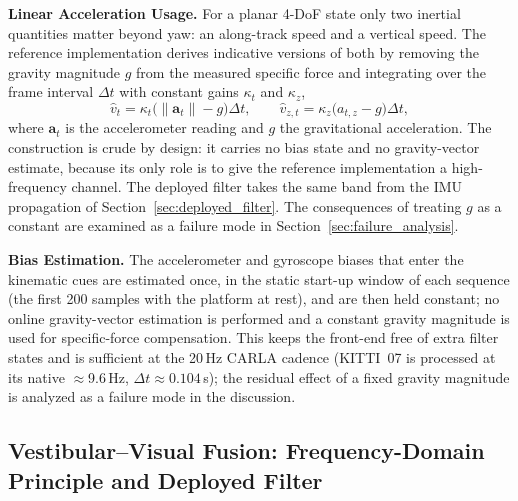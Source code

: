 \textbf{Linear Acceleration Usage.} For a planar 4-DoF state only two inertial quantities matter beyond yaw: an along-track speed and a vertical speed. The reference implementation derives indicative versions of both by removing the gravity magnitude $g$ from the measured specific force and integrating over the frame interval $\Delta t$ with constant gains $\kappa_t$ and $\kappa_z$,
\begin{equation}
    \hat v_{t} = \kappa_t\big(\lVert\mathbf{a}_t\rVert - g\big)\Delta t,
    \qquad
    \hat v_{z,t} = \kappa_z\big(a_{t,z} - g\big)\Delta t,
\end{equation}
where $\mathbf{a}_t$ is the accelerometer reading and $g$ the gravitational acceleration. The construction is crude by design: it carries no bias state and no gravity-vector estimate, because its only role is to give the reference implementation a high-frequency channel. The deployed filter takes the same band from the IMU propagation of Section~\ref{sec:deployed_filter}. The consequences of treating $g$ as a constant are examined as a failure mode in Section~\ref{sec:failure_analysis}.

\textbf{Bias Estimation.} The accelerometer and gyroscope biases that enter the kinematic cues are estimated once, in the static start-up window of each sequence (the first 200 samples with the platform at rest), and are then held constant; no online gravity-vector estimation is performed and a constant gravity magnitude is used for specific-force compensation. This keeps the front-end free of extra filter states and is sufficient at the 20\,Hz CARLA cadence (KITTI~07 is processed at its native $\approx$9.6\,Hz, $\Delta t\approx0.104$\,s); the residual effect of a fixed gravity magnitude is analyzed as a failure mode in the discussion.

\subsection{Vestibular--Visual Fusion: Frequency-Domain Principle and Deployed Filter}
\label{sec:fusion}


